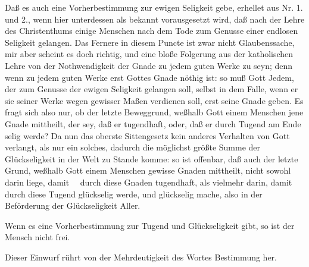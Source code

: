 \begin{aufza}
\item Daß es auch eine Vorherbestimmung zur ewigen Seligkeit gebe, erhellet aus Nr. 1. und 2., wenn hier unterdessen als bekannt vorausgesetzt wird, daß nach der Lehre des Christenthums einige Menschen nach dem Tode zum Genusse einer endlosen Seligkeit gelangen. Das Fernere in diesem Puncte ist zwar nicht Glaubenssache, mir aber scheint es doch richtig, und eine bloße Folgerung aus der katholischen Lehre von der Nothwendigkeit der Gnade zu jedem guten Werke zu seyn; denn wenn zu jedem guten Werke erst Gottes Gnade nöthig ist: so muß Gott Jedem, der zum Genusse der ewigen Seligkeit gelangen soll, selbst in dem Falle, wenn er sie seiner Werke wegen gewisser Maßen verdienen soll, erst seine Gnade geben. Es fragt sich also nur, ob der letzte Beweggrund, weßhalb Gott einem Menschen jene Gnade mittheilt, der sey, daß er tugendhaft, oder, daß er durch Tugend am Ende selig werde? Da nun das oberste Sittengesetz kein anderes Verhalten von Gott verlangt, als nur ein solches, dadurch die möglichst größte Summe der Glückseligkeit in der Welt zu Stande komme: so ist offenbar, daß auch der letzte Grund, weßhalb Gott einem Menschen gewisse Gnaden mittheilt, nicht sowohl darin liege, damit ~\ durch diese Gnaden tugendhaft, als vielmehr darin, damit  durch diese Tugend glückselig werde, und glückselig mache, also in der Beförderung der Glückseligkeit Aller.
\end{aufza}\par
{} Wenn es eine Vorherbestimmung zur Tugend und Glückseligkeit gibt, so ist der Mensch nicht frei.\par
{} Dieser Einwurf rührt von der Mehrdeutigkeit des Wortes Bestimmung her.
